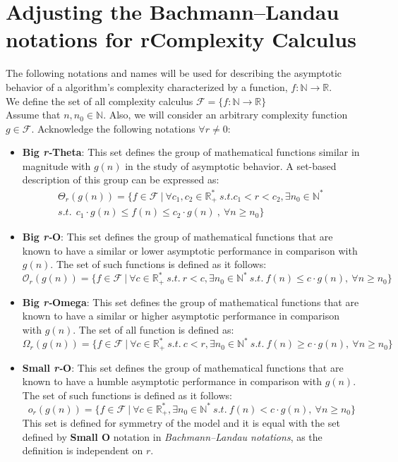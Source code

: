 \section{Adjusting the Bachmann–Landau notations for rComplexity Calculus}
The following notations and names will be used for describing the asymptotic behavior of a algorithm's complexity characterized by a function, $f:\mathbb{N}\longrightarrow\mathbb{R}$. \\
We define the set of all complexity calculus $\mathcal{F}= \lbrace f:\mathbb{N}\longrightarrow\mathbb{R} \rbrace$
\\Assume that $n, n_{0}\in\mathbb{N}$. Also, we will consider an arbitrary complexity function $g \in \mathcal{F}$. 
Acknowledge the following notations $\forall r \neq 0$:
\begin{itemize}
  \item \textbf{Big \textit{r-}Theta}: This set defines the group of mathematical functions similar in magnitude with  $g(n)$ in the study of asymptotic behavior. A set-based description of this group can be expressed as:
  \[\begin{split} \Theta_{r}(g(n)) = \lbrace f \in \mathcal{F}\ |\ \forall c_{1}, c_{2} \in \mathbb{R}^{*}_{+} \ s.t.  c_{1}< r < c_{2} , \exists n_{0} \in \mathbb{N}^{*}\ \\ s.t.\ \ c_{1} \cdot g(n) \leq f(n) \leq c_{2} \cdot g(n)\ ,\  \forall n \geq n_{0} \rbrace \end{split} \]
  
  \item \textbf{Big \textit{r-}O}: This set defines the group of mathematical functions that are known to have a similar or lower
 asymptotic performance in comparison with  $g(n)$. The set of such functions is defined as it follows:
  \[\mathcal{O}_{r}(g(n)) = \lbrace f \in \mathcal{F}\ |\ \forall c  \in \mathbb{R}^{*}_{+} \ s.t.\  r<c, \exists n_{0} \in \mathbb{N}^{*}\ s.t.\  f(n) \leq c \cdot g(n),\  \forall n \geq n_{0} \rbrace\]
  
  \item \textbf{Big \textit{r-}Omega}: This set defines the group of mathematical functions that are known to have a similar or higher asymptotic performance in comparison with  $g(n)$. The set of all function is defined as:
    \[\Omega_{r}(g(n)) = \lbrace f \in \mathcal{F}\ |\ \forall c  \in \mathbb{R}^{*}_{+}\ s.t. \ c < r, \exists n_{0} \in \mathbb{N}^{*}\ s.t.\  f(n) \geq c \cdot g(n),\  \forall n \geq n_{0} \rbrace\]

  \item \textbf{Small \textit{r-}O}:
  This set defines the group of mathematical functions that are known to have a humble
 asymptotic performance in comparison with  $g(n)$. The set of such functions is defined as it follows:
  \[o_{r}(g(n)) = \lbrace f \in \mathcal{F}\ |\ \forall c \in \mathbb{R}^{*}_{+}, \exists n_{0} \in \mathbb{N}^{*}\ s.t.\  f(n) < c \cdot g(n),\  \forall n \geq n_{0} \rbrace\]
  This set is defined for symmetry of the model and it is equal with the set defined by \textbf{Small O} notation in \textit{Bachmann–Landau notations}, as the definition is independent on $r$.
  

\end{itemize}
